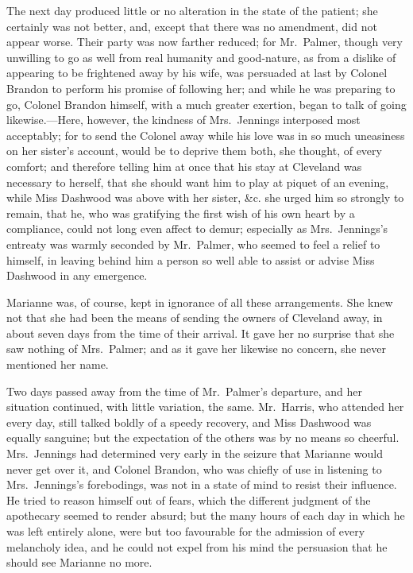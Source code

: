 The next day produced little or no alteration in the
state of the patient; she certainly was not better, and,
except that there was no amendment, did not appear worse.
Their party was now farther reduced; for Mr.\ Palmer,
though very unwilling to go as well from real humanity
and good-nature, as from a dislike of appearing to be
frightened away by his wife, was persuaded at last
by Colonel Brandon to perform his promise of following her;
and while he was preparing to go, Colonel Brandon himself,
with a much greater exertion, began to talk of going
likewise.---Here, however, the kindness of Mrs.\ Jennings
interposed most acceptably; for to send the Colonel away
while his love was in so much uneasiness on her sister's
account, would be to deprive them both, she thought,
of every comfort; and therefore telling him at once
that his stay at Cleveland was necessary to herself,
that she should want him to play at piquet of an evening,
while Miss Dashwood was above with her sister, \&c. she
urged him so strongly to remain, that he, who was gratifying
the first wish of his own heart by a compliance, could not
long even affect to demur; especially as Mrs.\ Jennings's
entreaty was warmly seconded by Mr.\ Palmer, who seemed
to feel a relief to himself, in leaving behind him a person
so well able to assist or advise Miss Dashwood in any emergence.

Marianne was, of course, kept in ignorance of all
these arrangements.  She knew not that she had been
the means of sending the owners of Cleveland away,
in about seven days from the time of their arrival.
It gave her no surprise that she saw nothing
of Mrs.\ Palmer; and as it gave her likewise no concern,
she never mentioned her name.

Two days passed away from the time of Mr.\ Palmer's departure,
and her situation continued, with little variation,
the same.  Mr.\ Harris, who attended her every day,
still talked boldly of a speedy recovery, and Miss Dashwood
was equally sanguine; but the expectation of the others
was by no means so cheerful.  Mrs.\ Jennings had determined
very early in the seizure that Marianne would never
get over it, and Colonel Brandon, who was chiefly
of use in listening to Mrs.\ Jennings's forebodings,
was not in a state of mind to resist their influence.
He tried to reason himself out of fears, which the different
judgment of the apothecary seemed to render absurd;
but the many hours of each day in which he was left
entirely alone, were but too favourable for the admission
of every melancholy idea, and he could not expel from
his mind the persuasion that he should see Marianne no more.

